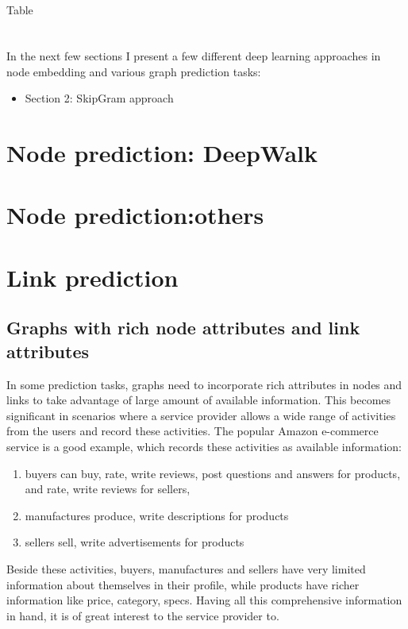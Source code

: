 \documentclass{article}
\begin{document}
Table

\begin{table}
	\centering
	\begin{tabularx}{\textwidth}{ |c|X| }
	\end{tabularx}
	\caption{}
\end{table}

In the next few sections I present a few different deep learning approaches in node embedding and various graph prediction tasks:
\begin{itemize}
	\item Section 2: SkipGram approach\cite{perozzi2014deepwalk}
\end{itemize}


\section{Node prediction: DeepWalk}


\section{Node prediction:others}

\section{Link prediction}

\subsection{Graphs with rich node attributes and link attributes}
In some prediction tasks, graphs need to incorporate rich attributes in nodes and links to take advantage of large amount of available information. This becomes significant in scenarios where a service provider allows a wide range of activities from the users and record these activities. The popular Amazon e-commerce service is a good example, which records these activities as available information:
\begin{enumerate}
	\item buyers can buy, rate, write reviews, post questions and answers for products, and rate, write reviews for sellers, 
	\item manufactures produce, write descriptions for products
	\item sellers sell, write advertisements for products
\end{enumerate}
Beside these activities, buyers, manufactures and sellers have very limited information about themselves in their profile, while products have richer information like price, category, specs. Having all this comprehensive information in hand, it is of great interest to the service provider to.



\end{document}
